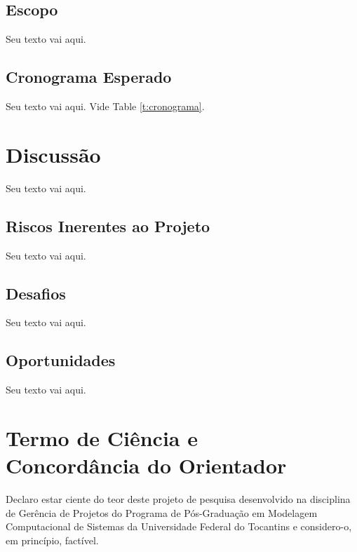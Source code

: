 \documentclass[journal]{IEEEtran}									%
\begin{document}
\subsection{Escopo}
Seu texto vai aqui.

\subsection{Cronograma Esperado}
Seu texto vai aqui. Vide Table \ref{t:cronograma}.

	
	

\section{Discussão}
Seu texto vai aqui.

\subsection{Riscos Inerentes ao Projeto}
Seu texto vai aqui.

\subsection{Desafios}
Seu texto vai aqui.

\subsection{Oportunidades}
Seu texto vai aqui.

\newpage 		%
\appendices 	%

\section*{Termo de Ciência e\\Concordância do Orientador} %
Declaro estar ciente do teor deste projeto de pesquisa desenvolvido na disciplina de Gerência de Projetos do Programa de Pós-Graduação em Modelagem Computacional de Sistemas da Universidade Federal do Tocantins e considero-o, em princípio, factível.
\end{document}
